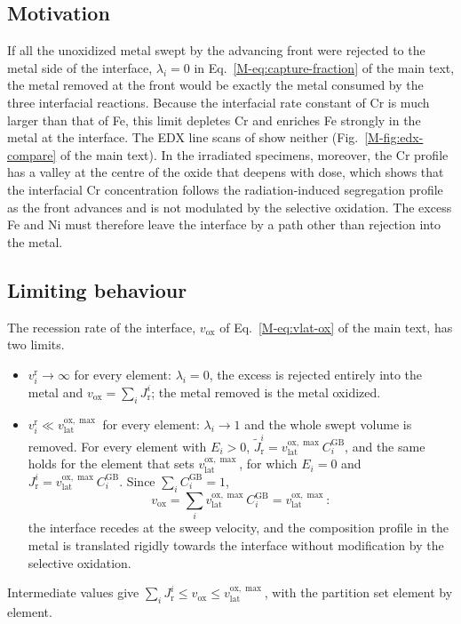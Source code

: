 \documentclass[12pt]{article}
\newcommand{\GB}{\mathrm{GB}}
\newcommand{\lat}{\mathrm{lat}}
\newcommand{\ox}{\mathrm{ox}}
\begin{document}
\subsection{Motivation}

If all the unoxidized metal swept by the advancing front were rejected to the
metal side of the interface, \(\lambda_i=0\) in
Eq.~\eqref{M-eq:capture-fraction} of the main text, the metal removed at the
front would be exactly the metal consumed by the three interfacial reactions.
Because the interfacial rate constant of Cr is much larger than that of Fe,
this limit depletes Cr and enriches Fe strongly in the metal at the interface.
The EDX line scans of \textcite{deng2017effect} show neither
(Fig.~\ref{M-fig:edx-compare} of the main text). In the irradiated specimens,
moreover, the Cr profile has a valley at the centre of the oxide that deepens
with dose, which shows that the interfacial Cr concentration follows the
radiation-induced segregation profile as the front advances and is not
modulated by the selective oxidation. The excess Fe and Ni must therefore
leave the interface by a path other than rejection into the metal.

\subsection{Limiting behaviour}

The recession rate of the interface, \(v_{\ox}\) of Eq.~\eqref{M-eq:vlat-ox}
of the main text, has two limits.
\begin{itemize}
  \item \(v_i^{\mathrm{r}}\to\infty\) for every element: \(\lambda_i=0\), the
        excess is rejected entirely into the metal and
        \(v_{\ox}=\sum_iJ_{\mathrm{r}}^{i}\); the metal removed is the metal
        oxidized.
  \item \(v_i^{\mathrm{r}}\ll v_{\lat}^{\ox,\max}\) for every element:
        \(\lambda_i\to1\) and the whole swept volume is removed. For every
        element with \(E_i>0\),
        \(\tilde{J}_{\mathrm{r}}^{i}=v_{\lat}^{\ox,\max}C_i^{\GB}\), and the
        same holds for the element that sets \(v_{\lat}^{\ox,\max}\), for which
        \(E_i=0\) and \(J_{\mathrm{r}}^{i}=v_{\lat}^{\ox,\max}C_i^{\GB}\).
        Since \(\sum_iC_i^{\GB}=1\),
        \begin{equation}
        v_{\ox}=\sum_i v_{\lat}^{\ox,\max}C_i^{\GB}=v_{\lat}^{\ox,\max}:
        \label{eq:si-vox-limit}
        \end{equation}
        the interface recedes at the sweep velocity, and the composition
        profile in the metal is translated rigidly towards the interface
        without modification by the selective oxidation.
\end{itemize}
Intermediate values give
\(\sum_iJ_{\mathrm{r}}^{i}\le v_{\ox}\le v_{\lat}^{\ox,\max}\), with the
partition set element by element.
\end{document}
